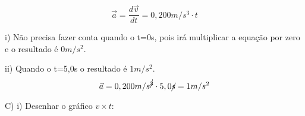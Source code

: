 \documentclass[a4paper, 12pt]{article}
\begin{document}
\begin{flushleft}
		\begin{equation*}
			\vec{a} = \dfrac{d\vec{v}}{dt} = 0,200m/s^3 \cdot t
		\end{equation*}
		
		i) Não precisa fazer conta quando o t=0s, pois irá multiplicar a equação por zero e o resultado é $0m/s^2$.
		
		ii) Quando o t=5,0s o resultado é $1m/s^2$.
		\begin{equation*}
			\vec{a} = 0,200m/s^{\cancel{3}} \cdot 5,0\cancel{s} = 1m/s^2
		\end{equation*}
		
		C)  
		i) Desenhar o gráfico $v \times t$:
		\begin{center}
		
		\end{center}
		
	\end{flushleft}
\end{document}
